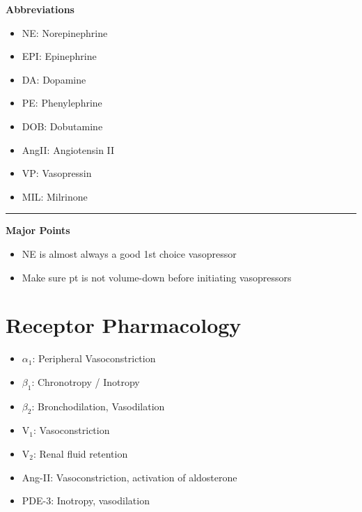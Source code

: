 \documentclass[main.tex]{subfiles}
\begin{document}
	
\begin{summarybox}
	\textbf{Abbreviations}
	\begin{multicols}{2}
		\begin{itemize}[noitemsep]
			\item NE: Norepinephrine
			\item EPI: Epinephrine
			\item DA: Dopamine
			\item PE: Phenylephrine
			\item DOB: Dobutamine
			\item AngII: Angiotensin II
			\item VP: Vasopressin
			\item MIL: Milrinone
		\end{itemize}
	\end{multicols}

	\centering \rule[0.5em]{0.8\linewidth}{0.4pt}

	\raggedright \textbf{Major Points}
	
	\begin{itemize}[noitemsep]
		\item NE is almost always a good 1st choice vasopressor
		\item Make sure pt is not volume-down before initiating vasopressors
	\end{itemize}
\end{summarybox}

\section{Receptor Pharmacology}
\begin{itemize}[noitemsep]
	\item $\alpha_1$: Peripheral Vasoconstriction
	\item $\beta_1$: Chronotropy / Inotropy
	\item $\beta_2$: Bronchodilation, Vasodilation
	\item V$_1$: Vasoconstriction
	\item V$_2$: Renal fluid retention
	\item Ang-II: Vasoconstriction, activation of aldosterone
	\item PDE-3: Inotropy, vasodilation
\end{itemize}
\end{document}
